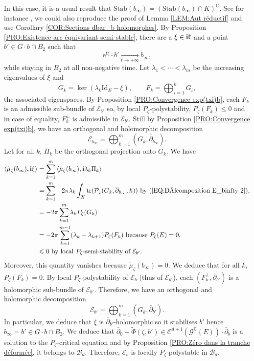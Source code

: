 \documentclass{article}
\theoremstyle{remark}
\theoremstyle{definition}
\newcommand{\C}{\mathbb{C}}
\newcommand{\tend}[2]{\underset{#1 \rightarrow #2}{\longrightarrow}}
\newcommand{\tr}{\mathrm{tr}}
\newcommand{\Stab}{\mathrm{Stab}}
\newcommand{\Id}{\mathrm{Id}}
\renewcommand{\i}{\boldsymbol{\mathrm{i}}}
\newcommand{\e}{\boldsymbol{\mathrm{e}}}
\newcommand{\scal}[2]{\left< #1,#2 \right>}
\newcommand{\E}{\mathcal{E}}
\newcommand{\G}{\mathcal{G}}
\newcommand{\mB}{\mathcal{B}}
\newcommand{\mC}{\mathcal{C}}
\newcommand{\mP}{\mathcal{P}}
\newcommand{\dbar}{\overline{\partial}}
\renewcommand{\leq}{\leqslant}
\begin{document}
In this case, it is a usual result that $\Stab(b_\infty) = (\Stab(b_\infty) \cap K)^\C$. See for instance \cite[Lemma 2.3]{GRS}, we could also reproduce the proof of Lemma \ref{LEM:Aut réductif} and use Corollary \ref{COR:Sections dbar_b holomorphes}. By Proposition \ref{PRO:Existence arc équivariant semi-stable}, there are a $\xi \in \i\frak{k}$ and a point $b' \in G \cdot b \cap B_2$ such that
$$
\e^{t\xi} \cdot b' \tend{t}{+\infty} b_\infty,
$$
while staying in $B_2$ at all non-negative time. Let $\lambda_1 < \cdots < \lambda_m$ be the increasing eigenvalues of $\xi$ and
$$
G_k = \ker(\lambda_k\Id_E - \xi), \qquad F_k = \bigoplus_{i = 1}^k G_i,
$$
the associated eigenspaces. By Proposition \ref{PRO:Convergence exp(txi)b}, each $F_k$ is an admissible sub-bundle of $\E_{b'}$ so, by local $P_\zeta$-polystability, $P_\zeta(F_k) \leq 0$ and in case of equality, $F_k^\bot$ is admissible in $\E_{b'}$. Still by Proposition \ref{PRO:Convergence exp(txi)b}, we have an orthogonal and holomorphic decomposition
\begin{equation}\label{EQ:Décomposition E_binfty 2}
    \E_{b_\infty} = \bigoplus_{k = 1}^m (G_k,\dbar_{b_\infty}).
\end{equation}
Let for all $k$, $\Pi_k$ be the orthogonal projection onto $G_k$. We have
\begin{align*}
    \scal{\tilde{\mu}_\zeta(b_\infty)}{\i\xi} & = \sum_{k = 1}^m \scal{\tilde{\mu}_\zeta(b_\infty)}{\i\lambda_k\Pi_k}\\
    & = \sum_{k = 1}^m -2\pi\lambda_k\int_X \tr(\mP_\zeta(G_k,\dbar_{b_\infty},h)) \textrm{ by (\ref{EQ:Décomposition E_binfty 2}),}\\
    & = -2\pi\sum_{k = 1}^m \lambda_kP_\zeta(G_k)\\
    & = -2\pi\sum_{k = 1}^{m - 1} (\lambda_k - \lambda_{k + 1})P_\zeta(F_k) \textrm{ because } P_\zeta(E) = 0,\\
    & \leq 0 \textrm{ by local $P_\zeta$-semi-stability of $\E_{b'}$.}
\end{align*}
Moreover, this quantity vanishes because $\tilde{\mu}_\zeta(b_\infty) = 0$. We deduce that for all $k$, $P_\zeta(F_k) = 0$. By local $P_\zeta$-polystability of $\E_b$ (thus of $\E_{b'}$), each $(F_k^\bot,\dbar_{b'})$ is a holomorphic sub-bundle of $\E_{b'}$. Therefore, we have an orthogonal and holomorphic decomposition
$$
\E_{b'} = \bigoplus_{k = 1}^m (G_k,\dbar_{b'}).
$$
In particular, we deduce that $\xi$ is $\dbar_{b'}$-holomorphic so it stabilises $b'$ hence $b_\infty = b' \in G \cdot b \cap B_2$. We deduce that $\dbar_0 + \tilde{\Phi}(\zeta,b') \in \mC^{d + 1}(\G^\C(E)) \cdot \dbar_b$ is a solution to the $P_\zeta$-critical equation and by Proposition \ref{PRO:Zéro dans la tranche déformée}, it belongs to $\mB_d$. Therefore, $\E_b$ is locally $P_\zeta$-polystable in $\mB_d$.
\end{document}
